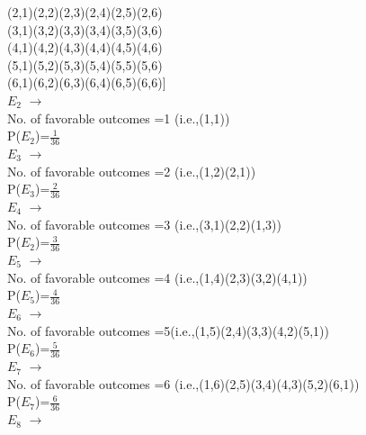 \documentclass[journel,12pt,twocoloums]{IEEEtran}
\begin{document}
(2,1)(2,2)(2,3)(2,4)(2,5)(2,6) \\

(3,1)(3,2)(3,3)(3,4)(3,5)(3,6) \\

(4,1)(4,2)(4,3)(4,4)(4,5)(4,6) \\

(5,1)(5,2)(5,3)(5,4)(5,5)(5,6) \\

(6,1)(6,2)(6,3)(6,4)(6,5)(6,6)]\\


$E_2$ $\to$ \\
No. of favorable outcomes =1  (i.e.,(1,1))\\

P($E_2$)=$\frac{1}{36}$\\


$E_3$ $\to$ \\

No. of favorable outcomes =2  (i.e.,(1,2)(2,1))\\

P($E_3$)=$\frac{2}{36}$\\
$E_4$ $\to$ \\

No. of favorable outcomes =3  (i.e.,(3,1)(2,2)(1,3))\\

P($E_2$)=$\frac{3}{36}$\\
$E_5$ $\to$ \\

No. of favorable outcomes =4 (i.e.,(1,4)(2,3)(3,2)(4,1))\\

P($E_5$)=$\frac{4}{36}$\\
$E_6$ $\to$ \\

No. of favorable outcomes =5(i.e.,(1,5)(2,4)(3,3)(4,2)(5,1))\\

P($E_6$)=$\frac{5}{36}$\\

$E_7$ $\to$ \\

No. of favorable outcomes =6  (i.e.,(1,6)(2,5)(3,4)(4,3)(5,2)(6,1))\\

P($E_7$)=$\frac{6}{36}$\\
$E_8$ $\to$ \\
\end{document}
